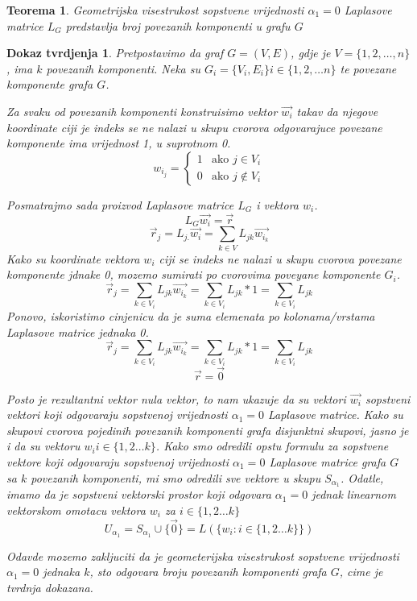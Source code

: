 \documentclass[11pt]{article}
\newtheorem{theorem}{Teorema}
\newtheorem*{custom_proof}{Dokaz tvrdjenja}
\begin{document}
	\begin{theorem} 
	Geometrijska visestrukost sopstvene vrijednosti $\alpha_1 = 0$ Laplasove matrice $L_G$ predstavlja broj povezanih komponenti u grafu $G$
	\end{theorem}
	
	\begin{custom_proof}
	Pretpostavimo da graf  $G = (V, E)$, gdje je $V = \{1, 2, \dots, n\}$, ima $k$ povezanih komponenti. Neka su $G_i = \{V_i,E_i\} i \in \{1,2, \dots n\}$ te povezane komponente grafa $G$.
	
	Za svaku od povezanih komponenti konstruisimo vektor $\vec{w_i}$ takav da njegove koordinate ciji je indeks se ne nalazi u skupu cvorova odgovarajuce povezane komponente ima vrijednost 1, u suprotnom 0.
	\[
	 w_{i_j} =
	 \begin{cases}
	 1  & \text{ako } j \in V_i \\ 
	 0  & \text{ako } j \notin V_i
	 \end{cases}
	\]
	
	Posmatrajmo sada proizvod Laplasove matrice $L_G$ i vektora $w_i$.
	\[
	L_G\vec{w_i} = \vec{r}
	\]
	\[
	\vec{r}_j = L_{j.} \vec{w_i} = \sum_{ k  \in V} L_{jk}\vec{w_{i_k}} 
	\]
	Kako su koordinate vektora $w_i$ ciji se indeks ne nalazi u skupu cvorova povezane komponente jdnake 0, mozemo sumirati po cvorovima poveyane komponente $G_i$. 
	\[
	\vec{r}_j = \sum_{ k  \in V_i} L_{jk}\vec{w_{i_k}} = \sum_{ k  \in V_i} L_{jk} * 1 = \sum_{ k  \in V_i} L_{jk}
	\]
	Ponovo, iskoristimo cinjenicu da je suma elemenata po kolonama/vrstama Laplasove matrice jednaka 0.
	\[
	\vec{r}_j = \sum_{ k  \in V_i} L_{jk}\vec{w_{i_k}} = \sum_{ k  \in V_i} L_{jk} * 1 = \sum_{ k  \in V_i} L_{jk}
	\]
	\[
	\vec{r} = \vec{0}
	\]
	
	Posto je rezultantni vektor nula vektor, to nam ukazuje da su vektori $\vec{w_i}$ sopstveni vektori koji odgovaraju sopstvenoj vrijednosti  $\alpha_1 = 0$ Laplasove matrice.
	Kako su skupovi cvorova pojedinih povezanih komponenti grafa disjunktni skupovi, jasno je i da su vektoru $w_i i \in \{1,2 \dots k\}$. Kako smo odredili opstu formulu za sopstvene vektore koji  odgovaraju sopstvenoj vrijednosti  $\alpha_1 = 0$ Laplasove matrice grafa $G$ sa $k$ povezanih komponenti, mi smo odredili sve vektore u skupu $S_{\alpha_1}$. Odatle, imamo da je sopstveni vektorski prostor koji  odgovara $\alpha_1 = 0$ jednak linearnom vektorskom omotacu vektora $w_i$ za $i \in \{1,2 \dots k\}$
	\[
	U_{\alpha_1} = S_{\alpha_1} \cup \{\vec{0}\}= L (\{ w_i : i \in \{1,2 \dots k\}\})
	\]
	
	Odavde mozemo zakljuciti da je geometerijska visestrukost sopstvene vrijednosti $\alpha_1 = 0$ jednaka $k$, sto odgovara broju povezanih komponenti grafa $G$, cime je tvrdnja dokazana.
	\end{custom_proof}
	
\end{document}
